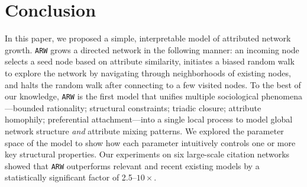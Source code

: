 \section{Conclusion}
\label{sec:Conclusion}
In this paper, we proposed a simple, interpretable model of attributed network
growth. \texttt{ARW} grows a directed network in the following manner: an
incoming node selects a seed node based on attribute similarity, initiates a
biased random walk to explore the network by navigating through neighborhoods of
existing nodes, and halts the random walk after connecting to a few visited
nodes. To the best of our knowledge, \texttt{ARW} is the first model that
unifies multiple sociological phenomena---bounded rationality; structural
constraints; triadic closure; attribute homophily; preferential
attachment---into a single local process to model global network structure
\textit{and} attribute mixing patterns.
We explored the parameter space of the model to show how each parameter
intuitively controls one or more key structural properties.
Our experiments on six
large-scale citation networks showed that \texttt{ARW} outperforms
relevant and recent existing models by a statistically significant
factor of 2.5--$10\times$.




